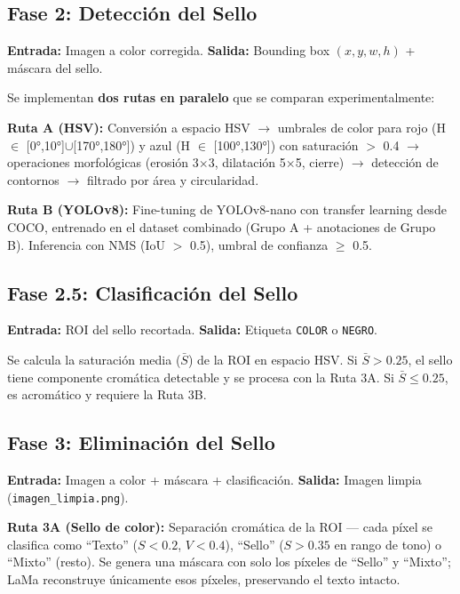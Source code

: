 \documentclass[11pt, a4paper]{article}
\begin{document}
\subsection{Fase 2: Detección del Sello}

\textbf{Entrada:} Imagen a color corregida. \textbf{Salida:} Bounding box $(x, y, w, h)$ + máscara del sello.

Se implementan \textbf{dos rutas en paralelo} que se comparan experimentalmente:

\textbf{Ruta A (HSV):} Conversión a espacio HSV $\rightarrow$ umbrales de color para rojo (H $\in$ [0°,10°]$\cup$[170°,180°]) y azul (H $\in$ [100°,130°]) con saturación $>$ 0.4 $\rightarrow$ operaciones morfológicas (erosión 3$\times$3, dilatación 5$\times$5, cierre) $\rightarrow$ detección de contornos $\rightarrow$ filtrado por área y circularidad.

\textbf{Ruta B (YOLOv8):} Fine-tuning de YOLOv8-nano con transfer learning desde COCO, entrenado en el dataset combinado (Grupo A + anotaciones de Grupo B). Inferencia con NMS (IoU $>$ 0.5), umbral de confianza $\geq$ 0.5.

\subsection{Fase 2.5: Clasificación del Sello}

\textbf{Entrada:} ROI del sello recortada. \textbf{Salida:} Etiqueta \texttt{COLOR} o \texttt{NEGRO}.

Se calcula la saturación media ($\bar{S}$) de la ROI en espacio HSV. Si $\bar{S} > 0.25$, el sello tiene componente cromática detectable y se procesa con la Ruta 3A. Si $\bar{S} \leq 0.25$, es acromático y requiere la Ruta 3B.

\subsection{Fase 3: Eliminación del Sello}

\textbf{Entrada:} Imagen a color + máscara + clasificación. \textbf{Salida:} Imagen limpia (\texttt{imagen\_limpia.png}).

\textbf{Ruta 3A (Sello de color):} Separación cromática de la ROI --- cada píxel se clasifica como ``Texto'' ($S < 0.2$, $V < 0.4$), ``Sello'' ($S > 0.35$ en rango de tono) o ``Mixto'' (resto). Se genera una máscara con solo los píxeles de ``Sello'' y ``Mixto''; LaMa reconstruye únicamente esos píxeles, preservando el texto intacto.
\end{document}
